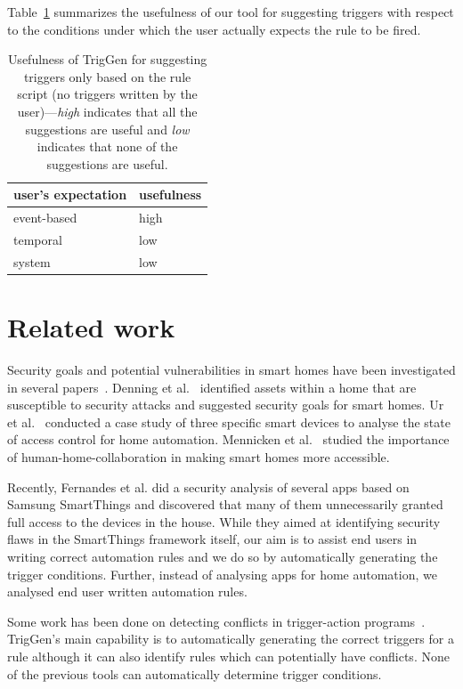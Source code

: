 \documentclass{sig-alternate-05-2015}
\begin{document}
Table~\ref{tab:scope1} summarizes the usefulness of our tool for suggesting triggers with respect to the conditions under which the user actually expects the rule to be fired.
\begin{table}[ht]
\centering
\begin{tabular}{|l|l|}
\hline
user's expectation & usefulness \\ \hline
event-based & high \\ \hline
temporal & low \\\hline
system & low \\ \hline
\end{tabular}
\caption{Usefulness of TrigGen for suggesting triggers only based on the rule script (no triggers written by the user)---\textit{high} indicates that all the suggestions are useful and \textit{low} indicates that none of the suggestions are useful. }
\label{tab:scope1}
\end{table}

\section{Related work}
Security goals and potential vulnerabilities in smart homes have been investigated in several papers~\cite{yoshi, dhanjani, jung, todayToTomorrow}. Denning et al.~\cite{yoshi} identified assets within a home that are susceptible to security attacks and suggested security goals for smart homes. Ur et al.~\cite{jung} conducted a case study of three specific smart devices to analyse the state of access control for home automation. Mennicken et al.~\cite{todayToTomorrow} studied the importance of human-home-collaboration in making smart homes more accessible.

Recently, Fernandes et al.\cite{smartthings16} did a security analysis of several apps based on Samsung SmartThings and discovered that many of them unnecessarily granted full access to the devices in the house. While they aimed at identifying security flaws in the SmartThings framework itself, our aim is to assist end users in writing correct automation rules and we do so by automatically generating the trigger conditions.  Further, instead of analysing apps for home automation, we analysed end user written automation rules.

Some work has been done on detecting conflicts in trigger-action programs~\cite{rvs, homer, utea, Nakamura05featureinteractions}. TrigGen's main capability is to automatically generating the correct triggers for a rule although it can also identify rules which can potentially have conflicts. None of the previous tools can automatically determine trigger conditions.
\end{document}
